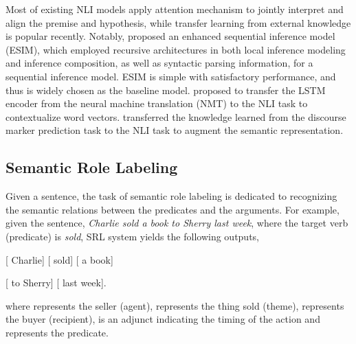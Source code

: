\documentclass[11pt]{article}
\begin{document}
Most of existing NLI models apply attention  mechanism  to  jointly  interpret  and  align the premise and hypothesis,  while  transfer  learning  from
external knowledge is popular recently. Notably, \citet{Chen2017Enhanced}  proposed  an  enhanced  sequential  inference model (ESIM), which employed recursive architectures in both local inference modeling and
inference composition, as well as syntactic
parsing information, for a sequential inference model. ESIM is simple with satisfactory performance, and thus is widely chosen as the baseline model. \citet{Mccann2017Learned} proposed  to
transfer  the  LSTM  encoder  from  the  neural
machine translation (NMT) to the NLI task to contextualize word vectors. \citet{pan2018discourse} transferred the  knowledge learned from the discourse marker prediction task
to the NLI task to augment the semantic representation.

\subsection{Semantic Role Labeling}
Given a sentence, the task of semantic role labeling is dedicated to recognizing the semantic relations between the predicates
and the arguments. For example, given the sentence, \emph{Charlie sold a book to Sherry last week}, where the target verb (predicate) is \emph{sold}, SRL system yields the following outputs,
\begin{spacing}{1.3}
\end{spacing}
[ Charlie] [ sold] [ a book] 

[ to Sherry] [ last week].
\begin{spacing}{1.3}
\end{spacing}
\noindent where  represents the  seller (agent),  represents the thing sold (theme),  represents the buyer (recipient),  is an adjunct indicating the timing of the action and  represents the predicate.
\end{document}
